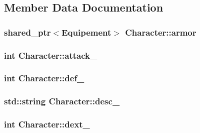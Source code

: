 \subsection{Member Data Documentation}
\hypertarget{classCharacter_a3077b0ff06c2f9f96eeb2b79593d667c}{
\subsubsection[{armor}]{\setlength{\rightskip}{0pt plus 5cm}shared\-\_\-ptr$<${\bf Equipement}$>$ Character\-::armor\hspace{0.3cm}{\ttfamily [protected]}}}\label{classCharacter_a3077b0ff06c2f9f96eeb2b79593d667c}
\hypertarget{classCharacter_af7c66c07511bfb6a844510c09262f9f7}{
\subsubsection[{attack\-\_\-}]{\setlength{\rightskip}{0pt plus 5cm}int Character\-::attack\-\_\-\hspace{0.3cm}{\ttfamily [protected]}}}\label{classCharacter_af7c66c07511bfb6a844510c09262f9f7}
\hypertarget{classCharacter_af5403de4a39c8859b69335e60ea3d6ca}{
\subsubsection[{def\-\_\-}]{\setlength{\rightskip}{0pt plus 5cm}int Character\-::def\-\_\-\hspace{0.3cm}{\ttfamily [protected]}}}\label{classCharacter_af5403de4a39c8859b69335e60ea3d6ca}
\hypertarget{classCharacter_af3efafb3ef9078df69d9cefb701b9b25}{
\subsubsection[{desc\-\_\-}]{\setlength{\rightskip}{0pt plus 5cm}std\-::string Character\-::desc\-\_\-\hspace{0.3cm}{\ttfamily [protected]}}}\label{classCharacter_af3efafb3ef9078df69d9cefb701b9b25}
\hypertarget{classCharacter_a3cc8f2752c0199a62e8fef854bfca6d5}{
\subsubsection[{dext\-\_\-}]{\setlength{\rightskip}{0pt plus 5cm}int Character\-::dext\-\_\-\hspace{0.3cm}{\ttfamily [protected]}}}\label{classCharacter_a3cc8f2752c0199a62e8fef854bfca6d5}
